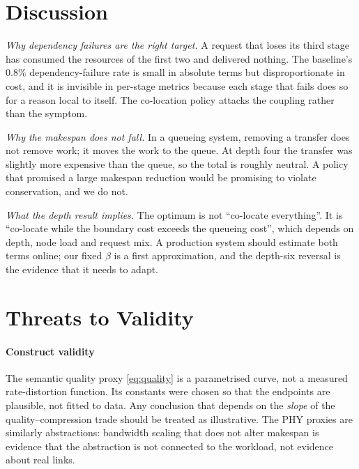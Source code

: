 \documentclass[journal,10pt]{IEEEtran}
\begin{document}
\section{Discussion}
\label{sec:disc}

\emph{Why dependency failures are the right target.} A request that loses its
third stage has consumed the resources of the first two and delivered nothing.
The baseline's $0.8\%$ dependency-failure rate is small in absolute terms but
disproportionate in cost, and it is invisible in per-stage metrics because each
stage that fails does so for a reason local to itself. The co-location policy
attacks the coupling rather than the symptom.

\emph{Why the makespan does not fall.} In a queueing system, removing a transfer
does not remove work; it moves the work to the queue. At depth four the transfer
was slightly more expensive than the queue, so the total is roughly neutral. A
policy that promised a large makespan reduction would be promising to violate
conservation, and we do not.

\emph{What the depth result implies.} The optimum is not ``co-locate
everything''. It is ``co-locate while the boundary cost exceeds the queueing
cost'', which depends on depth, node load and request mix. A production system
should estimate both terms online; our fixed $\beta$ is a first
approximation, and the depth-six reversal is the evidence that it needs to
adapt.

\section{Threats to Validity}
\label{sec:threats}

\paragraph{Construct validity}
The semantic quality proxy \eqref{eq:quality} is a parametrised curve, not a
measured rate-distortion function. Its constants were chosen so that the
endpoints are plausible, not fitted to data. Any conclusion that depends on the
\emph{slope} of the quality--compression trade should be treated as
illustrative. The PHY proxies are similarly abstractions: bandwidth scaling
that does not alter makespan is evidence that the abstraction is not connected
to the workload, not evidence about real links.
\end{document}

